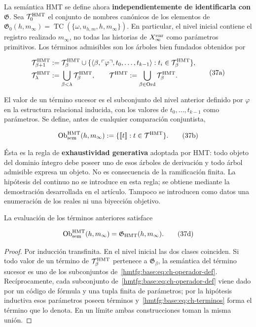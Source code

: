 La semántica HMT se define ahora \textbf{independientemente de identificarla con \(\mathfrak G\)}. Sea \(\mathcal T_0^{\rm HMT}\) el conjunto de nombres
canónicos de los elementos de
\(\mathfrak G_0(h,m_\infty)=
\operatorname{TC}(\{\omega,u_{h,m},h,m_\infty\})\). En particular, el nivel
inicial contiene el registro realizado \(m_\infty\), no todas las historias de
\(X_\infty^{\rm enr}\) como parámetros primitivos.
Los términos admisibles son los árboles bien fundados obtenidos por

\[
 \begin{aligned}
 \mathcal T^{\rm HMT}_{\beta+1}
 &:={\mathcal T}^{\rm HMT}_\beta\cup
 \{\langle\beta,\ulcorner\varphi\urcorner,
       t_0,\ldots,t_{k-1}\rangle:
       t_i\in\mathcal T^{\rm HMT}_\beta\},\\
 \mathcal T^{\rm HMT}_\lambda&:=
       \bigcup_{\beta<\lambda}\mathcal T^{\rm HMT}_\beta,
 \qquad
 \mathcal T^{\rm HMT}:=
       \bigcup_{\beta\in\operatorname{Ord}}\mathcal T^{\rm HMT}_\beta.
 \end{aligned}
\tag{37a}\label{hmtfg:base:eq:ch-terminos}
\]

El valor de un término sucesor es el subconjunto del nivel anterior definido
por \(\varphi\) en la estructura relacional inducida, con los valores de
\(t_0,\ldots,t_{k-1}\) como parámetros. Se define, antes de cualquier
comparación conjuntista,

\[
 \operatorname{Ob}_{\rm sem}^{\rm HMT}(h,m_\infty)
 :=\{\llbracket t\rrbracket:t\in\mathcal T^{\rm HMT}\}.
\tag{37b}\label{hmtfg:base:eq:ch-objetos-semanticos}
\]

Ésta es la regla de \textbf{exhaustividad generativa} adoptada por HMT: todo
objeto del dominio íntegro debe poseer uno de esos árboles de derivación y todo
árbol admisible expresa un objeto. No es consecuencia de la ramificación
finita. La hipótesis del continuo no se introduce en esta regla; se obtiene
mediante la demostración desarrollada en el artículo. Tampoco se introducen
como datos una enumeración de los reales ni una biyección objetivo.

\begin{theorem}
\label{hmtfg:base:thm:ch-6a}
La evaluación de
los términos anteriores satisface

\[
 \operatorname{Ob}_{\rm sem}^{\rm HMT}(h,m_\infty)
 =\mathfrak G_{\rm HMT}(h,m_\infty).
\tag{37d}\label{hmtfg:base:eq:ch-equivalencia-semantica}
\]

\end{theorem}
\begin{proof}
Por inducción transfinita. En el nivel inicial las dos clases
coinciden. Si todo valor de un término de
\(\mathcal T^{\rm HMT}_\beta\) pertenece a
\(\mathfrak G_\beta\), la semántica del término sucesor es uno de los
subconjuntos de~\eqref{hmtfg:base:eq:ch-operador-def}. Recíprocamente, cada subconjunto de~\eqref{hmtfg:base:eq:ch-operador-def} viene dado por
un código de fórmula y una tupla finita de parámetros; por la hipótesis
inductiva esos parámetros poseen términos y~\eqref{hmtfg:base:eq:ch-terminos} forma el término que lo
denota. En un límite ambas construcciones toman la misma unión.
\end{proof}

